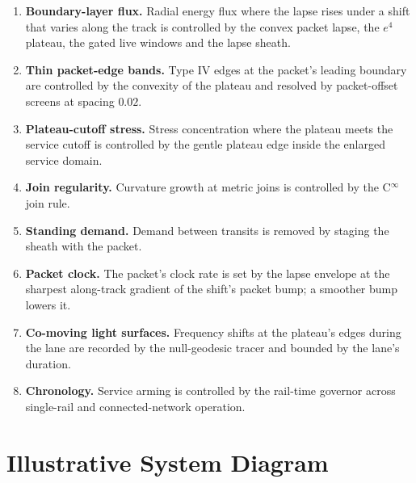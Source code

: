 \documentclass[11pt]{article}
\begin{document}
\begin{enumerate}
\item \textbf{Boundary-layer flux.} Radial energy flux where the lapse rises under a shift that varies along the track is controlled by the convex packet lapse, the $e^{4}$ plateau, the gated live windows and the lapse sheath.
\item \textbf{Thin packet-edge bands.} Type IV edges at the packet's leading boundary are controlled by the convexity of the plateau and resolved by packet-offset screens at spacing $0.02$.
\item \textbf{Plateau-cutoff stress.} Stress concentration where the plateau meets the service cutoff is controlled by the gentle plateau edge inside the enlarged service domain.
\item \textbf{Join regularity.} Curvature growth at metric joins is controlled by the C$^\infty$ join rule.
\item \textbf{Standing demand.} Demand between transits is removed by staging the sheath with the packet.
\item \textbf{Packet clock.} The packet's clock rate is set by the lapse envelope at the sharpest along-track gradient of the shift's packet bump; a smoother bump lowers it.
\item \textbf{Co-moving light surfaces.} Frequency shifts at the plateau's edges during the lane are recorded by the null-geodesic tracer and bounded by the lane's duration.
\item \textbf{Chronology.} Service arming is controlled by the rail-time governor across single-rail and connected-network operation.
\end{enumerate}

\section{Illustrative System Diagram}
\end{document}
